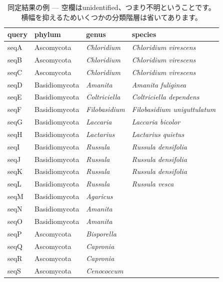 \documentclass[titlepage,10pt,a4paper]{jsbook}
\begin{document}
\begin{table}[h]
\begin{center}
\footnotesize\setlength{\baselineskip}{0.9em}%
\begin{tabular}{l|lll} 
query & phylum & genus & species \\\hline\hline
seqA & Ascomycota & \textit{Chloridium} & \textit{Chloridium virescens} \\
seqB & Ascomycota & \textit{Chloridium} & \textit{Chloridium virescens} \\
seqC & Ascomycota & \textit{Chloridium} & \textit{Chloridium virescens} \\
seqD & Basidiomycota & \textit{Amanita} & \textit{Amanita fuliginea} \\
seqE & Basidiomycota & \textit{Coltriciella} & \textit{Coltriciella dependens} \\
seqF & Basidiomycota & \textit{Filobasidium} & \textit{Filobasidium uniguttulatum} \\
seqG & Basidiomycota & \textit{Laccaria} & \textit{Laccaria bicolor} \\
seqH & Basidiomycota & \textit{Lactarius} & \textit{Lactarius quietus} \\
seqI & Basidiomycota & \textit{Russula} & \textit{Russula densifolia} \\
seqJ & Basidiomycota & \textit{Russula} & \textit{Russula densifolia} \\
seqK & Basidiomycota & \textit{Russula} & \textit{Russula densifolia} \\
seqL & Basidiomycota & \textit{Russula} & \textit{Russula vesca} \\
seqM & Basidiomycota & \textit{Agaricus} &  \\
seqN & Basidiomycota & \textit{Amanita} &  \\
seqO & Basidiomycota & \textit{Amanita} &  \\
seqP & Ascomycota & \textit{Bisporella} &  \\
seqQ & Ascomycota & \textit{Capronia} &  \\
seqR & Ascomycota & \textit{Capronia} &  \\
seqS & Ascomycota & \textit{Cenococcum} &  \\
\end{tabular}
\end{center}
\caption{同定結果の例 --- 空欄はunidentified、つまり不明ということです。
横幅を抑えるためいくつかの分類階層は省いてあります。}
\label{table:exampleresultsofidentification}
\end{table}
\end{document}
